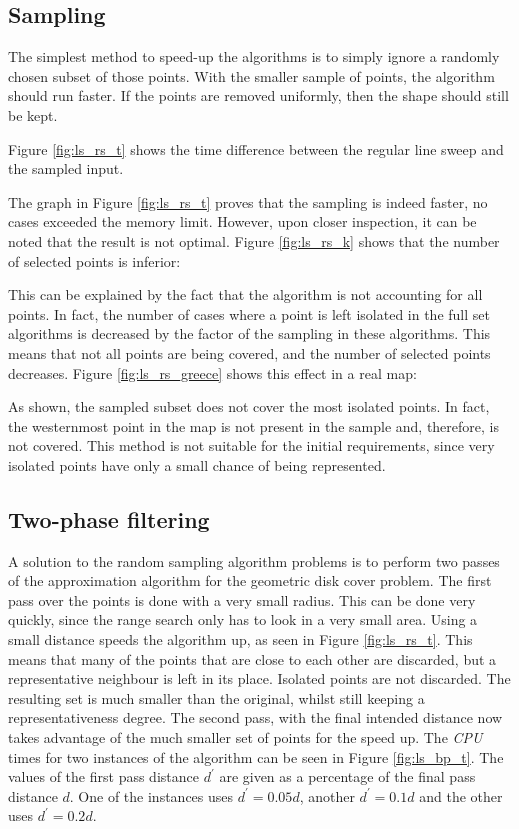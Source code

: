 \subsection{Sampling}
The simplest method to speed-up the algorithms is to simply ignore a randomly chosen subset of those points. With the smaller sample of points, the algorithm should run faster. If the points are removed uniformly, then the shape should still be kept.

Figure \ref{fig:ls_rs_t} shows the time difference between the regular line sweep and the sampled input.



The graph in Figure \ref{fig:ls_rs_t} proves that the sampling is indeed faster, no cases exceeded the memory limit. However, upon closer inspection, it can be noted that the result is not optimal. Figure \ref{fig:ls_rs_k} shows that the number of selected points is inferior:



This can be explained by the fact that the algorithm is not accounting for all points. In fact, the number of cases where a point is left isolated in the full set algorithms is decreased by the factor of the sampling in these algorithms. This means that not all points are being covered, and the number of selected points decreases. Figure \ref{fig:ls_rs_greece} shows this effect in a real map:



As shown, the sampled subset does not cover the most isolated points. In fact, the westernmost point in the map is not present in the sample and, therefore, is not covered. This method is not suitable for the initial requirements, since very isolated points have only a small chance of being represented.

\subsection{Two-phase filtering}
A solution to the random sampling algorithm problems is to perform two passes of the approximation algorithm for the geometric disk cover problem. The first pass over the points is done with a very small radius. This can be done very quickly, since the range search only has to look in a very small area. Using a small distance speeds the algorithm up, as seen in Figure \ref{fig:ls_rs_t}. This means that many of the points that are close to each other are discarded, but a representative neighbour is left in its place. Isolated points are not discarded. The resulting set is much smaller than the original, whilst still keeping a representativeness degree. The second pass, with the final intended distance now takes advantage of the much smaller set of points for the speed up. The \emph{CPU} times for two instances of the algorithm can be seen in Figure \ref{fig:ls_bp_t}. The values of the first pass distance $d^\prime$ are given as a percentage of the final pass distance $d$. One of the instances uses $d^\prime=0.05d$, another $d^\prime=0.1d$ and the other uses $d^\prime=0.2d$.

